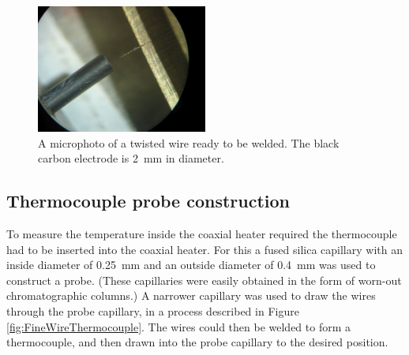 \begin{figure}
	\centering
	\includegraphics[width=0.5\textwidth]{./Figures/WelderMicro.jpg}
	\decoRule
	
\caption[A microphoto of a thermocouple twist ready to be welded.]{A microphoto
of a twisted wire ready to be welded. The black carbon electrode is
\SI{2}{\milli\metre} in diameter.}
	
	\label{fig:TCWeldMicro}
\end{figure}

\subsection{Thermocouple probe construction}

To measure the temperature inside the coaxial heater required the thermocouple
had to be inserted into the coaxial heater. For this a fused silica capillary
with an inside diameter of \SI{0.25}{\milli\metre} and an outside diameter of
\SI{0.4}{\milli\metre} was used to construct a probe. (These capillaries were
easily obtained in the form of worn-out chromatographic columns.) A narrower
capillary was used to draw the wires through the probe capillary, in a process
described in Figure \ref{fig:FineWireThermocouple}. The wires could then be
welded to form a thermocouple, and then drawn into the probe capillary to the
desired position.

